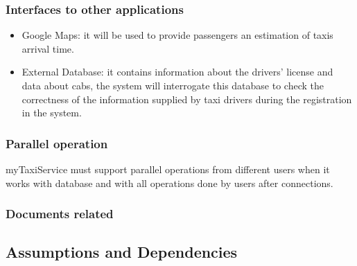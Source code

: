\documentclass[a4paper,12pt]{article}%
\begin{document}
\subsubsection{Interfaces to other applications}
\begin{itemize}
\item Google Maps: it will be used to provide passengers an estimation of taxis arrival time.
\item External Database: it contains information about the drivers' license and data about cabs, the system will interrogate this database to check the correctness of the information supplied by taxi drivers during the registration in the system.
\end{itemize} 
\subsubsection{Parallel operation}
myTaxiService must support parallel operations from different users when it works
with database and with all operations done by users after connections.
\subsubsection{Documents related}
\subsection{Assumptions and Dependencies}
\end{document}
